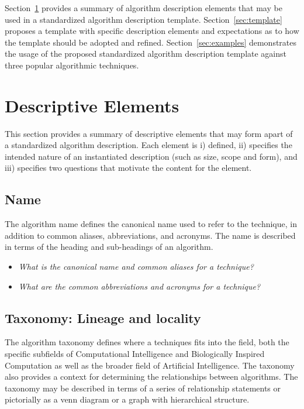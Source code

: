 \documentclass[a4paper, 11pt]{article}
\begin{document}
Section~\ref{sec:elements} provides a summary of algorithm description elements that may be used in a standardized algorithm description template. Section~\ref{sec:template} proposes a template with specific description elements and expectations as to how the template should be adopted and refined. Section~\ref{sec:examples} demonstrates the usage of the proposed standardized algorithm description template against three popular algorithmic techniques.

\section{Descriptive Elements}
\label{sec:elements}
This section provides a summary of descriptive elements that may form apart of a standardized algorithm description. Each element is i) defined, ii) specifies the intended nature of an instantiated description (such as size, scope and form), and iii) specifies two questions that motivate the content for the element.

\subsection{Name}
The algorithm name defines the canonical name used to refer to the technique, in addition to common aliases, abbreviations, and acronyms. The name is described in terms of the heading and sub-headings of an algorithm.

\begin{itemize}
	\item \emph{What is the canonical name and common aliases for a technique?}
	\item \emph{What are the common abbreviations and acronyms for a technique?}
\end{itemize}

\subsection{Taxonomy: Lineage and locality}
The algorithm taxonomy defines where a techniques fits into the field, both the specific subfields of Computational Intelligence and Biologically Inspired Computation as well as the broader field of Artificial Intelligence. The taxonomy also provides a context for determining the relationships between algorithms. The taxonomy may be described in terms of a series of relationship statements or pictorially as a venn diagram or a graph with hierarchical structure.
\end{document}
